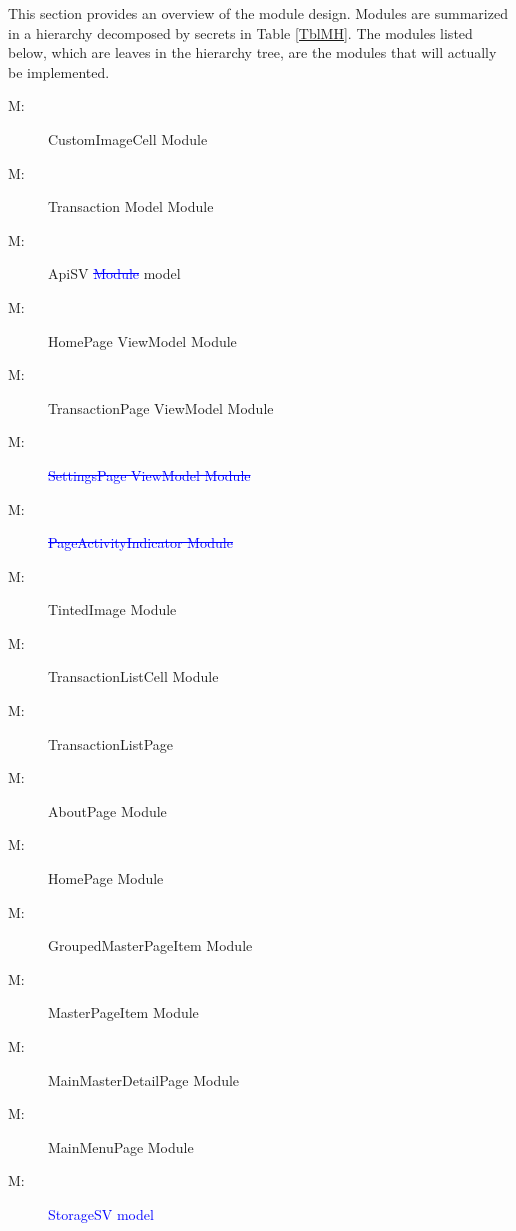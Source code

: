 \documentclass[12pt, titlepage]{article}
\newcounter{mnum}
\newcommand{\mthemnum}{M\themnum}
\begin{document}
This section provides an overview of the module design. Modules are summarized
in a hierarchy decomposed by secrets in Table \ref{TblMH}. The modules listed
below, which are leaves in the hierarchy tree, are the modules that will
actually be implemented.

\begin{description}
\item [ \mthemnum \label{m1}:] CustomImageCell Module
\item [ \mthemnum \label{m2}:] Transaction Model Module
\item [ \mthemnum \label{m3}:] ApiSV \textcolor{blue}{\st{Module}} model
\item [ \mthemnum \label{m4}:] HomePage ViewModel Module
\item [ \mthemnum \label{m5}:] TransactionPage ViewModel Module
\item [ \mthemnum \label{m6}:] \textcolor{blue}{\st{ SettingsPage ViewModel Module}}
\item [ \mthemnum \label{m7}:] \textcolor{blue}{\st{ PageActivityIndicator Module}}
\item [ \mthemnum \label{m8}:] TintedImage Module
\item [ \mthemnum \label{m9}:] TransactionListCell Module
\item [ \mthemnum \label{m10}:] TransactionListPage
\item [ \mthemnum \label{m11}:] AboutPage Module
\item [ \mthemnum \label{m12}:] HomePage Module
\item [ \mthemnum \label{m13}:] GroupedMasterPageItem Module
\item [ \mthemnum \label{m14}:] MasterPageItem Module
\item [ \mthemnum \label{m15}:] MainMasterDetailPage Module
\item [ \mthemnum \label{m16}:] MainMenuPage Module
\item [ \mthemnum \label{m17}:]\textcolor{blue}{StorageSV model}

\end{description}
\end{document}
